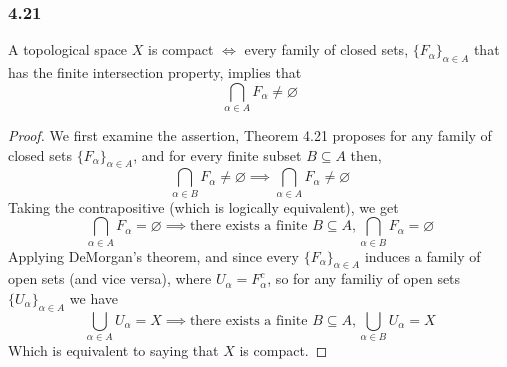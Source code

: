 \documentclass[../../main.tex]{subfiles}
\begin{document}
\subsubsection*{4.21}
\begin{wts}
A topological space $X$ is compact $\iff$ every family of closed sets, $\{F_\alpha\}_{\alpha\in A}$ that has the finite intersection property, implies that 
\[
\bigcap_{\alpha\in A}F_\alpha\neq\varnothing
\]
\end{wts}
\newcommand{\fa}{\{F_\alpha\}_{\alpha\in A}}
\newcommand{\ua}{\{U_\alpha\}_{\alpha\in A}}
\begin{proof}
We first examine the assertion, Theorem 4.21 proposes for any family of closed sets $\{F_\alpha\}_{\alpha\in A}$, and for every finite subset $B\subseteq A$ then,
\[
\bigcap_{\alpha\in B} F_\alpha\neq\varnothing\implies\bigcap_{\alpha\in A}F_\alpha\neq\varnothing
\]
Taking the contrapositive (which is logically equivalent), we get
\[
\bigcap_{\alpha\in A}F_\alpha=\varnothing\implies \text{there exists a finite } B\subseteq A, \bigcap_{\alpha\in B}F_\alpha = \varnothing
\]
Applying DeMorgan's theorem, and since every $\fa$ induces a family of open sets (and vice versa), where $U_\alpha=F_\alpha^c$, so for any familiy of open sets $\ua$ we have
\[
\bigcup_{\alpha\in A}U_\alpha = X\implies \text{there exists a finite } B\subseteq A, \bigcup_{\alpha\in B}U_\alpha = X
\]
Which is equivalent to saying that $X$ is compact.
\end{proof}
\end{document}

